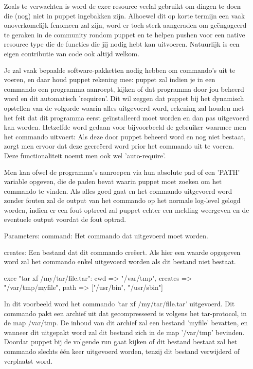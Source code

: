 	Zoals te verwachten is word de exec resource veelal gebruikt om dingen te doen die (nog) niet in puppet ingebakken zijn.
	Alhoewel dit op korte termijn een vaak onoverkomelijk fenomeen zal zijn, word er toch sterk aangeraden om geëngageerd te geraken in de community rondom puppet en te helpen pushen voor een native resource type die de functies die jij nodig hebt kan uitvoeren.
	Natuurlijk is een eigen contributie van code ook altijd welkom.

	Je zal vaak bepaalde software-pakketten nodig hebben om commando's uit te voeren, en daar houd puppet rekening mee:
	puppet zal indien je in een commando een programma aanroept, kijken of dat programma door jou beheerd word en dit automatisch 'requiren'.
	Dit wil zeggen dat puppet bij het dynamisch opstellen van de volgorde waarin alles uitgevoerd word, rekening zal houden met het feit dat dit programma eerst geïnstalleerd moet worden en dan pas uitgevoerd kan worden.
	Hetzelfde word gedaan voor bijvoorbeeld de gebruiker waarmee men het commando uitvoert:
	Als deze door puppet beheerd word en nog niet bestaat, zorgt men ervoor dat deze gecreëerd word prior het commando uit te voeren.
	Deze functionaliteit noemt men ook wel 'auto-require'.

	Men kan ofwel de programma's aanroepen via hun absolute pad of een 'PATH' variable opgeven, die de paden bevat waarin puppet moet zoeken om het commando te vinden.
	Als alles goed gaat en het commando uitgevoerd word zonder fouten zal de output van het commando op het normale log-level gelogd worden, indien er een fout optreed zal puppet echter een melding weergeven en de eventuele output voordat de fout optrad.


	Parameters:
		command:
		Het commando dat uitgevoerd moet worden.

		creates:
		Een bestand dat dit commando creëert.
		Als hier een waarde opgegeven word zal het commando enkel uitgevoerd worden als dit bestand niet bestaat.

			exec { "tar xf /my/tar/file.tar":
				cwd => "/var/tmp",
				creates => "/var/tmp/myfile",
				path => ["/usr/bin", "/usr/sbin"]
			}

		In dit voorbeeld word het commando 'tar xf /my/tar/file.tar' uitgevoerd.
		Dit commando pakt een archief uit dat gecompresseerd is volgens het tar-protocol, in de map /var/tmp.
		De inhoud van dit archief zal een bestand 'myfile' bevatten, en wanneer dit uitgepakt word zal dit bestand zich in de map '/var/tmp' bevinden.
		Doordat puppet bij de volgende run gaat kijken of dit bestand bestaat zal het commando slechts één keer uitgevoerd worden, tenzij dit bestand verwijderd of verplaatst word.

